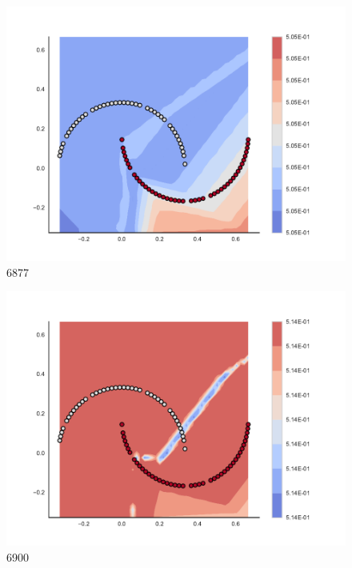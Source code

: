 \begin{subfigure}[b]{0.09\textwidth}
    \includegraphics[clip, trim=2.35cm 1.75cm 4.5cm 0cm,width=\textwidth]{img/convergence/6877.pdf}
    \caption{6877}
    \label{fig:convergence_6877}
\end{subfigure}
%
\begin{subfigure}[b]{0.09\textwidth}
    \includegraphics[clip, trim=2.35cm 1.75cm 4.5cm 0cm,width=\textwidth]{img/convergence/6900.pdf}
    \caption{6900}
    \label{fig:convergence_6900}
\end{subfigure}
%
